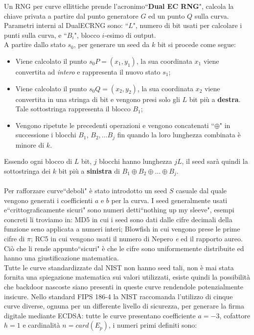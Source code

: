 \documentclass[a4paper,12pt]{tesiinfo}
\begin{document}
Un RNG per curve ellittiche prende l'acronimo``\textbf{Dual EC RNG}", calcola la chiave privata a partire dal punto generatore $G$ ed un punto $Q$ sulla curva. Parametri interni al DualECRNG sono: ``$L$", numero di bit usati per calcolare i punti sulla curva, e ``$B_i$", blocco $i$-esimo di output.
\\
A partire dallo stato $s_0$, per generare un seed da $k$ bit si procede come segue: 
\begin{itemize}
    \item Viene calcolato il punto $s_0P = (x_1, y_1)$, la sua coordinata $x_1$ viene convertita ad \textit{intero} e rappresenta il nuovo stato $s_1$;
    \item Viene calcolato il punto $s_0Q = (x_2, y_2)$, la sua coordinata $x_2$ viene convertita in una stringa di bit e vengono presi solo gli $L$ bit pi\`u a \textbf{destra}. Tale sottostringa rappresenta il blocco $B_1$;
    \item Vengono ripetute le precedenti operazioni e vengono concatenati ``$\oplus$" in successione i blocchi $B_1$, $B_2, \ldots B_j$ fin quando la loro lunghezza combinata \`e minore di $k$. 
\end{itemize}
Essendo ogni blocco di $L$ bit, $j$ blocchi hanno lunghezza $jL$, il seed sar\`a quindi la sottostringa dei $k$ bit pi\`u a \textbf{sinistra} di $B_1 \oplus B_2 \oplus \ldots \oplus B_j$.
\\
\\
Per rafforzare curve``deboli" \`e stato introdotto un seed $S$ casuale dal quale vengono generati i coefficienti $a$ e $b$ per la curva. I seed generalmente usati e``crittograficamente sicuri" sono numeri detti``nothing up my sleeve", esempi concreti li troviamo in: MD5 in cui i seed sono dati dalle cifre decimali della funzione seno applicata a numeri interi; Blowfish in cui vengono prese le prime cifre di $\pi$; RC5 in cui vengono usati il numero di Nepero \textit{e} ed il rapporto aureo. Ci\`o che li rende appunto``sicuri" \`e che le cifre sono uniformemente distribuite ed hanno una giustificazione matematica. 
\\
Tutte le curve standardizzate dal NIST non hanno seed tali, non \`e mai stata fornita una spiegazione matematica sui valori utilizzati, esiste quindi la possibilit\`a che backdoor nascoste siano presenti in queste curve rendendole potenzialmente insicure. Nello standard FIPS 186-4 la NIST raccomanda l'utilizzo di cinque curve diverse, ognuna per un differente livello di sicurezza, per generare la firma digitale mediante ECDSA: tutte le curve presentano coefficiente $a=-3$, cofattore $h=1$ e cardinalit\`a $n=card(E_p)$, i numeri primi definiti sono:
\end{document}
